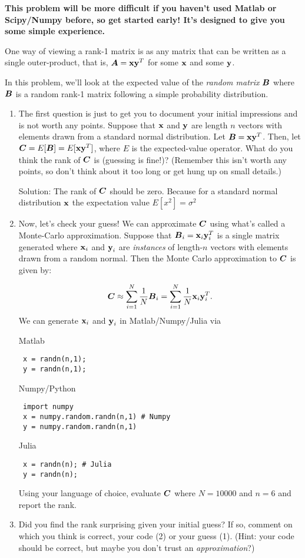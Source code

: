 \documentclass{article}
\begin{document}
\textbf{This problem will be more difficult if you haven'{}t used Matlab or Scipy/Numpy before, so get started early! It'{}s designed to give you some simple experience.}

One way of viewing a rank-1 matrix is as any matrix that can be written as a single outer-product, that is, $\boldsymbol{A} = \boldsymbol{\mathrm{x}} \boldsymbol{\mathrm{y}}^T$ for some $\boldsymbol{\mathrm{x}}$ and some $\boldsymbol{\mathrm{y}}$.

In this problem, we'{}ll look at the expected value of the \emph{random matrix} $\boldsymbol{B}$ where $\boldsymbol{B}$ is a random rank-1 matrix following a simple probability distribution.

\begin{enumerate}%
\item The first question is just to get you to document your initial impressions and is not worth any points. Suppose that $\boldsymbol{\mathrm{x}}$ and $\boldsymbol{\mathrm{y}}$ are length $n$ vectors with elements drawn from a standard normal distribution. Let $\boldsymbol{B} = \boldsymbol{\mathrm{x}} \boldsymbol{\mathrm{y}}^T$. Then, let $\boldsymbol{C} = E[\boldsymbol{B}] = E[\boldsymbol{\mathrm{x}} \boldsymbol{\mathrm{y}}^T]$, where $E$ is the expected-value operator. What do you think the rank of $\boldsymbol{C}$ is (guessing is fine!)? (Remember this isn'{}t worth any points, so don'{}t think about it too long or get hung up on small details.)

Solution:  The rank of $\boldsymbol{C}$ should be zero. Because for a standard normal distribution $\boldsymbol{\mathrm{x}}$ the expectation value  $E[x^2] = \sigma^2 $ 

\item Now, let'{}s check your guess! We can approximate $\boldsymbol{C}$ using what'{}s called a Monte-Carlo approximation. Suppose that $\boldsymbol{B}_i = \boldsymbol{\mathrm{x}}_i \boldsymbol{\mathrm{y}}_i^T$ is a single matrix generated where $\boldsymbol{\mathrm{x}}_i$ and $\boldsymbol{\mathrm{y}}_i$ are \emph{instances} of length-$n$ vectors with elements drawn from a random normal. Then the Monte Carlo approximation to $\boldsymbol{C}$ is given by:

\begin{displaymath}
\boldsymbol{C} \approx \sum_{i=1}^N \frac{1}{N} \boldsymbol{B}_i = \sum_{i=1}^N  \frac{1}{N} \boldsymbol{\mathrm{x}}_i \boldsymbol{\mathrm{y}}_i^T.
\end{displaymath}
We can generate $\boldsymbol{\mathrm{x}}_i$ and $\boldsymbol{\mathrm{y}}_i$ in Matlab/Numpy/Julia via

Matlab

\begin{verbatim} x = randn(n,1); 
 y = randn(n,1);\end{verbatim}
Numpy/Python

\begin{verbatim} import numpy
 x = numpy.random.randn(n,1) # Numpy
 y = numpy.random.randn(n,1)\end{verbatim}
Julia

\begin{verbatim} x = randn(n); # Julia
 y = randn(n); \end{verbatim}
Using your language of choice, evaluate $\boldsymbol{C}$ where $N = 10000$ and $n=6$ and report the rank.


\item Did you find the rank surprising given your initial guess? If so, comment on which you think is correct, your code (2) or your guess (1). (Hint: your code should be correct, but maybe you don'{}t trust an \emph{approximation}?)



\end{enumerate}
\end{document}
